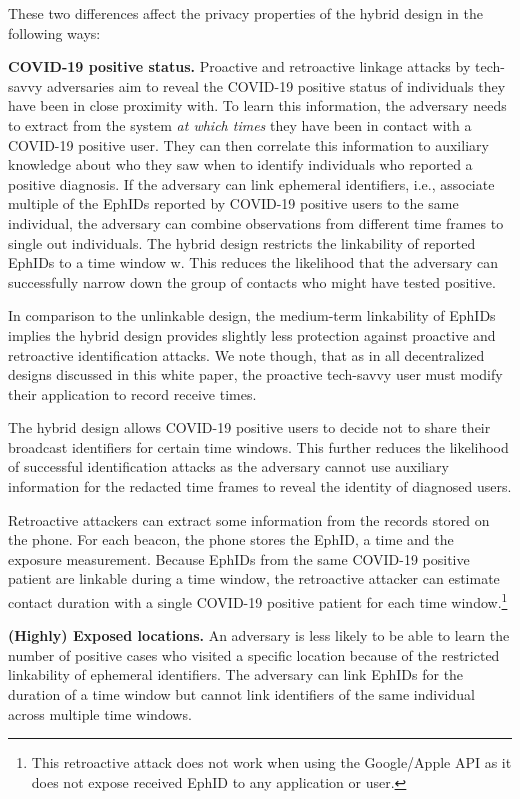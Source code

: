 \documentclass{article}
\begin{document}
These two differences affect the privacy properties of the hybrid design
in the following ways:

\textbf{COVID-19 positive status.} Proactive and retroactive linkage
attacks by tech-savvy adversaries aim to reveal the COVID-19 positive
status of individuals they have been in close proximity with. To learn
this information, the adversary needs to extract from the system
\emph{at which times} they have been in contact with a COVID-19 positive
user. They can then correlate this information to auxiliary knowledge
about who they saw when to identify individuals who reported a positive
diagnosis. If the adversary can link ephemeral identifiers, i.e.,
associate multiple of the EphIDs reported by COVID-19 positive users to
the same individual, the adversary can combine observations from
different time frames to single out individuals. The hybrid design
restricts the linkability of reported EphIDs to a time window w. This
reduces the likelihood that the adversary can successfully narrow down
the group of contacts who might have tested positive.

In comparison to the unlinkable design, the medium-term linkability of
EphIDs implies the hybrid design provides slightly less protection
against proactive and retroactive identification attacks. We note
though, that as in all decentralized designs discussed in this white
paper, the proactive tech-savvy user must modify their application to
record receive times.

The hybrid design allows COVID-19 positive users to decide not to share
their broadcast identifiers for certain time windows. This further
reduces the likelihood of successful identification attacks as the
adversary cannot use auxiliary information for the redacted time frames
to reveal the identity of diagnosed users.

Retroactive attackers can extract some information from the records
stored on the phone. For each beacon, the phone stores the EphID, a time
and the exposure measurement. Because EphIDs from the same COVID-19
positive patient are linkable during a time window, the retroactive
attacker can estimate contact duration with a single COVID-19 positive
patient for each time window.\footnote{This retroactive attack does not
  work when using the Google/Apple API as it does not expose received
  EphID to any application or user.}

\textbf{(Highly) Exposed locations.} An adversary is less likely to be
able to learn the number of positive cases who visited a specific
location because of the restricted linkability of ephemeral identifiers.
The adversary can link EphIDs for the duration of a time window but
cannot link identifiers of the same individual across multiple time
windows.
\end{document}

